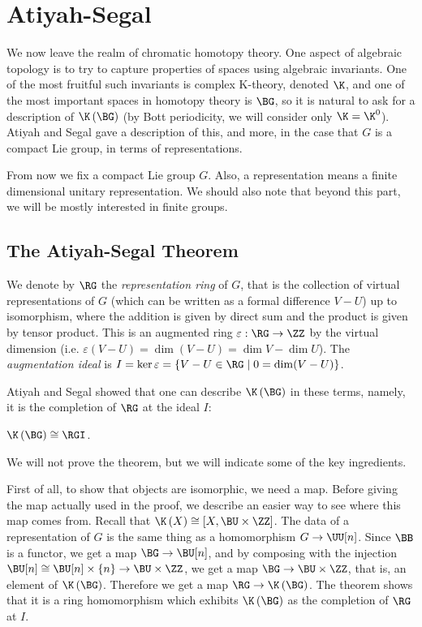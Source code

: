 \section{Atiyah-Segal}

We now leave the realm of chromatic homotopy theory.
One aspect of algebraic topology is to try to capture properties of spaces using algebraic invariants.
One of the most fruitful such invariants is complex K-theory, denoted $\K$, and one of the most important spaces in homotopy theory is $\BG$, so it is natural to ask for a description of $\K\left(\BG\right)$ (by Bott periodicity, we will consider only $\K = \K^0$).
Atiyah and Segal \cite{AS} gave a description of this, and more, in the case that $G$ is a compact Lie group, in terms of representations.

From now we fix a compact Lie group $G$.
Also, a representation means a finite dimensional unitary representation.
We should also note that beyond this part, we will be mostly interested in finite groups.



\subsection{The Atiyah-Segal Theorem}

We denote by $\RG$ the \emph{representation ring} of $G$, that is the collection of virtual representations of $G$ (which can be written as a formal difference $V - U$) up to isomorphism, where the addition is given by direct sum and the product is given by tensor product.
This is an augmented ring $\varepsilon: \RG \to \ZZ$ by the virtual dimension (i.e. $\varepsilon\left(V-U\right) = \dim\left(V-U\right) = \dim V - \dim U$).
The \emph{augmentation ideal} is $I = \ker \varepsilon = \left\{ V - U \in \RG \mid 0 = \dim(V-U) \right\}$.

Atiyah and Segal showed that one can describe $\K\left(\BG\right)$ in these terms, namely, it is the completion of $\RG$ at the ideal $I$:

\begin{theorem}[{\cite{AS}}]\label{AS-private}
	$\K\left(\BG\right) \cong \RGI$.
\end{theorem}

We will not prove the theorem, but we will indicate some of the key ingredients.

First of all, to show that objects are isomorphic, we need a map.
Before giving the map actually used in the proof, we describe an easier way to see where this map comes from.
Recall that $\K\left(X\right) \cong \left[X, \BU \times \ZZ\right]$.
The data of a representation of $G$ is the same thing as a homomorphism $G \to \UU[n]$.
Since $\BB$ is a functor, we get a map $\BG \to \BU[n]$, and by composing with the injection $\BU[n] \cong \BU[n] \times \left\{n\right\} \to \BU \times \ZZ$, we get a map $\BG \to \BU \times \ZZ$, that is, an element of $\K\left(\BG\right)$.
Therefore we get a map $\RG \to \K\left(\BG\right)$.
The theorem shows that it is a ring homomorphism which exhibits $\K\left(\BG\right)$ as the completion of $\RG$ at $I$.

